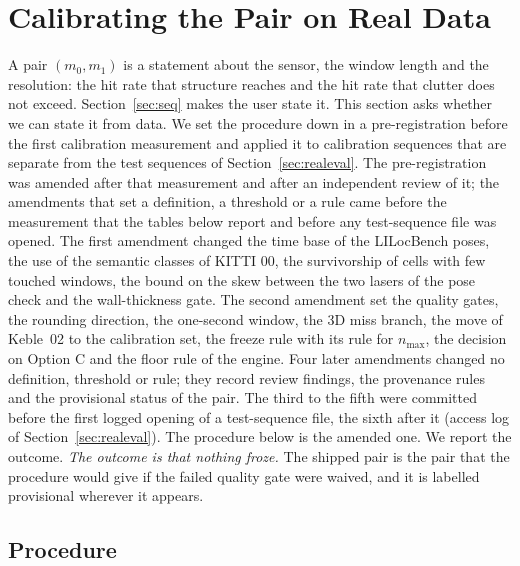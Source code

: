 \section{Calibrating the Pair on Real Data}\label{sec:calib}

A pair $(m_0,m_1)$ is a statement about the sensor, the window length and the resolution: the hit rate that structure reaches and the hit rate that clutter does not exceed. Section~\ref{sec:seq} makes the user state it. This section asks whether we can state it from data. We set the procedure down in a pre-registration before the first calibration measurement and applied it to calibration sequences that are separate from the test sequences of Section~\ref{sec:realeval}. The pre-registration was amended after that measurement and after an independent review of it; the amendments that set a definition, a threshold or a rule came before the measurement that the tables below report and before any test-sequence file was opened. The first amendment changed the time base of the LILocBench poses, the use of the semantic classes of KITTI 00, the survivorship of cells with few touched windows, the bound on the skew between the two lasers of the pose check and the wall-thickness gate. The second amendment set the quality gates, the rounding direction, the one-second window, the 3D miss branch, the move of Keble~02 to the calibration set, the freeze rule with its rule for $n_{\max}$, the decision on Option C and the floor rule of the engine. Four later amendments changed no definition, threshold or rule; they record review findings, the provenance rules and the provisional status of the pair. The third to the fifth were committed before the first logged opening of a test-sequence file, the sixth after it (access log of Section~\ref{sec:realeval}). The procedure below is the amended one. We report the outcome. \emph{The outcome is that nothing froze.} The shipped pair is the pair that the procedure would give if the failed quality gate were waived, and it is labelled provisional wherever it appears.

\subsection{Procedure}\label{subsec:calibproc}

